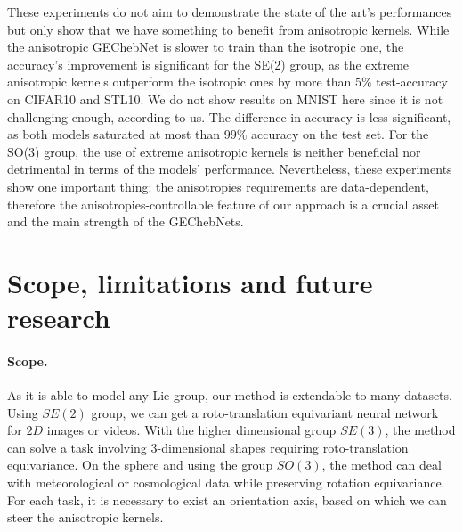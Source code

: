 \documentclass{article}
\newcommand{\haguettaz}[1]{{\color[rgb]{.8,.3,.2}{#1}}}
\begin{document}
These experiments do not aim to demonstrate the state of the art's performances but only show that we have something to benefit from anisotropic kernels. While the anisotropic GEChebNet is slower to train than the isotropic one, the accuracy's improvement is significant for the SE(2) group, as the extreme anisotropic kernels outperform the isotropic ones by more than $5\%$ test-accuracy on CIFAR10 and STL10. We do not show results on MNIST here since it is not challenging enough, according to us. The difference in accuracy is less significant, as both models saturated at most than $99\%$ accuracy on the test set. For the SO(3) group, the use of extreme anisotropic kernels is neither beneficial nor detrimental in terms of the models' performance. Nevertheless, these experiments show one important thing: the anisotropies requirements are data-dependent, therefore the anisotropies-controllable feature of our approach is a crucial asset and the main strength of the GEChebNets.

\haguettaz{comment so3 performance}

\section{Scope, limitations and future research} \label{sec:scope_limitations_future_research}

\paragraph{Scope.} As it is able to model any Lie group, our method is extendable to many datasets. Using $SE(2)$ group, we can get a roto-translation equivariant neural network for $2D$ images or videos. With the higher dimensional group $SE(3)$, the method can solve a task involving 3-dimensional shapes requiring roto-translation equivariance. On the sphere and using the group $SO(3)$, the method can deal with meteorological or cosmological data while preserving rotation equivariance. For each task, it is necessary to exist an orientation axis, based on which we can steer the anisotropic kernels.
\end{document}
